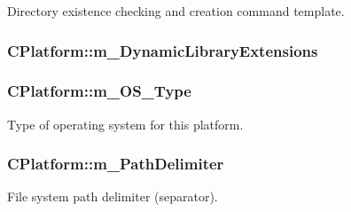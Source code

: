 Directory existence checking and creation command template. 

\hypertarget{classCPlatform_a5a8d28621cc908b51fa19284899e4374}{
\subsubsection[{m\-\_\-\-Dynamic\-Library\-Extensions}]{ C\-Platform\-::m\-\_\-\-Dynamic\-Library\-Extensions\hspace{0.3cm}{\ttfamily [private]}}}\label{classCPlatform_a5a8d28621cc908b51fa19284899e4374}
\hypertarget{classCPlatform_a7ca30334ae5baa1adf6b77ffc1e7daac}{
\subsubsection[{m\-\_\-\-O\-S\-\_\-\-Type}]{\setlength{\rightskip}{0pt plus 5cm}C\-Platform\-::m\-\_\-\-O\-S\-\_\-\-Type\hspace{0.3cm}{\ttfamily [private]}}}\label{classCPlatform_a7ca30334ae5baa1adf6b77ffc1e7daac}


Type of operating system for this platform. 

\hypertarget{classCPlatform_a9f8da12c0ef92a1660218fe7e33beced}{
\subsubsection[{m\-\_\-\-Path\-Delimiter}]{\setlength{\rightskip}{0pt plus 5cm}C\-Platform\-::m\-\_\-\-Path\-Delimiter\hspace{0.3cm}{\ttfamily [private]}}}\label{classCPlatform_a9f8da12c0ef92a1660218fe7e33beced}


File system path delimiter (separator). 

